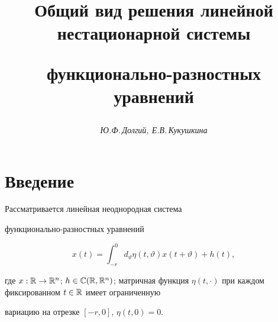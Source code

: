 




\author{\it Ю.Ф.\,Долгий, Е.В.\,Кукушкина}




\title{Общий вид решения линейной нестационарной системы


функционально-разностных уравнений}





\date{}




\pagestyle{plain} %







\maketitle


\label{begin}








\section{Введение}





Рассматривается линейная неоднородная система


функционально-разностных уравнений


\begin{equation}


x (t)=\int_{-r}^{0}d_{\vartheta}\eta (t,\vartheta)


x (t+\vartheta) +h (t),\label{f1}


\end{equation}


где $x:\Bbb{R}\to\Bbb{R}^{n}$; $h\in\Bbb{C} (


\Bbb{R},\Bbb{R}^{n})$; матричная функция $\eta (


t,\cdot)$ при каждом фиксированном $t\in\Bbb{R}$ имеет ограниченную


вариацию на отрезке $[-r,0]$, $\eta (t,0)=0$.





